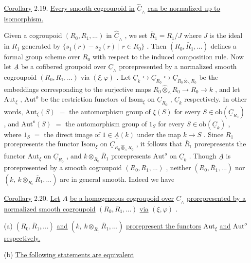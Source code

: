 \underline{Corollary} 2.19.  \underline{Every smooth cogroupoid in}  $\hat{\underline{C}}_\wedge$  \underline{can be normalized up to isomorphism.}

Given a cogroupoid  $(R_0,R_1,\dots)$  in  $\hat{\underline{C}}_\wedge$ , we set  $\bar{R}_1 = R_1/J$  where  $J$  is the ideal in  $R_1$  generated by  $\{s_1(r) - s_2(r) \mid r \in R_0\}$ . Then  $(R_0,\bar{R}_1,\dots)$  defines a formal group scheme over  $R_0$  with respect to the induced composition rule. Now let  $\underline{A}$  be a cofibered groupoid over  $\underline{C}_\wedge$  prorepresented by a normalized smooth cogroupoid  $(R_0,R_1,\dots)$  via  $(\xi,\varphi)$ . Let  $\underline{C}_k \hookrightarrow \underline{C}_{R_0} \hookrightarrow \underline{C}_{R_0 \hat{\otimes}_\wedge R_0}$  be the embeddings corresponding to the surjective maps  $R_0 \hat{\otimes}_\wedge R_0 \longrightarrow R_0 \longrightarrow k$ , and let  $\mathrm{Aut}_\xi$ , $\mathrm{Aut}^o$  be the restriction functors of  $\mathrm{Isom}_\xi$  on  $\underline{C}_{R_0}$ , $\underline{C}_k$  respectively. In other words,  $\mathrm{Aut}_\xi(S)$ $=$ the automorphism group of  $\xi(S)$  for every  $S \in \mathrm{ob}(\underline{C}_{R_0})$ , and  $\mathrm{Aut}^o(S)$ $=$ the automorphism group of  $1_S$  for every  $S \in \mathrm{ob}(\underline{C}_k)$ , where  $1_S$ $=$ the direct image of  $1 \in \underline{A}(k)$  under the map  $k \to S$ . Since  $R_1$  prorepresents the functor  $\mathrm{Isom}_\xi$  on  $\underline{C}_{R_0 \hat{\otimes}_\wedge R_0}$ , it follows that  $\bar{R}_1$  prorepresents the functor  $\mathrm{Aut}_\xi$  on  $\underline{C}_{R_0}$ , and  $k \otimes_{R_0} \bar{R}_1$  prorepresents  $\mathrm{Aut}^o$  on  $\underline{C}_k$ . Though  $\underline{A}$  is prorepresented by a smooth cogroupoid  $(R_0,R_1,\dots)$  , neither  $(R_0,\bar{R}_1,\dots)$  nor  $(k,\ k \otimes_{R_0} \bar{R}_1,\dots)$  are in general smooth. Indeed we have

\underline{Corollary} 2.20.  \underline{Let}  $\underline{A}$  \underline{be a homogeneous cogroupoid over}  $\underline{C}_\wedge$  \underline{prorepresented by a normalized smooth cogroupoid}  $(R_0,R_1,\dots)$  \underline{via}  $(\xi,\varphi)$  .

(a)  $(R_0,\bar{R}_1,\dots)$  \underline{and}  $(k,\ k \otimes_{R_0} \bar{R}_1,\dots)$  \underline{prorepresent the functors}  $\mathrm{Aut}_\xi$  \underline{and}  $\mathrm{Aut}^o$  \underline{respectively.}

(b)  \underline{The following statements are equivalent}

